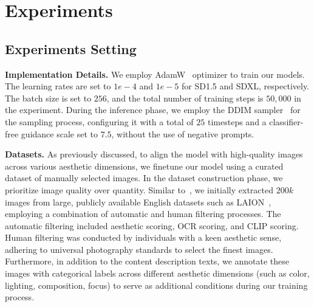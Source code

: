 \section{Experiments}
\label{sec:Experiments}
\subsection{Experiments Setting}
\noindent \textbf{Implementation Details.} We employ AdamW~\cite{loshchilov2017decoupled} optimizer to train our models. The learning rates are set to \(1e-4\) and \(1e-5\) for SD1.5 and SDXL, respectively. The batch size is set to \(256\), and the total number of training steps is \(50,000\) in the experiment. During the inference phase, we employ the DDIM sampler~\cite{song2020denoising} for the sampling process, configuring it with a total of \(25\) timesteps and a classifier-free guidance scale set to \(7.5\), without the use of negative prompts.

\noindent \textbf{Datasets.} As previously discussed, to align the model with high-quality images across various aesthetic dimensions, we finetune our model using a curated dataset of manually selected images. In the dataset construction phase, we prioritize image quality over quantity. Similar to~\cite{dai2023emu}, we initially extracted \(200k\) images from large, publicly available English datasets such as LAION~\cite{schuhmann2021laion}, employing a combination of automatic and human filtering processes. The automatic filtering included aesthetic scoring, OCR scoring, and CLIP scoring. Human filtering was conducted by individuals with a keen aesthetic sense, adhering to universal photography standards to select the finest images. Furthermore, in addition to the content description texts, we annotate these images with categorical labels across different aesthetic dimensions (such as color, lighting, composition, focus) to serve as additional conditions during our training process.

